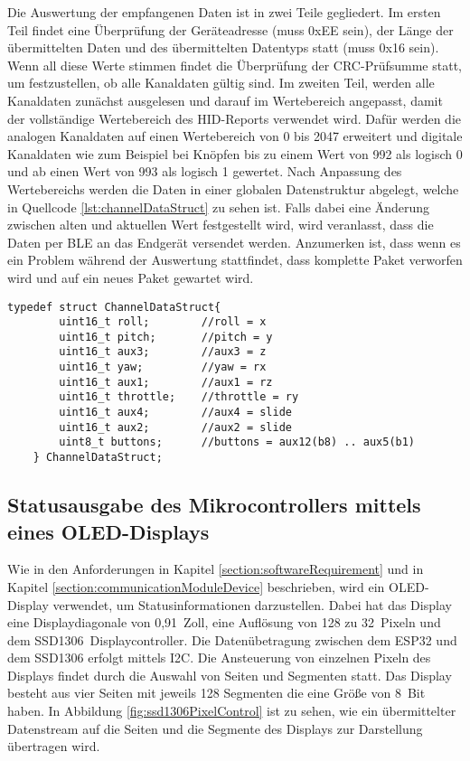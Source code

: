 Die Auswertung der empfangenen Daten ist in zwei Teile gegliedert. Im ersten Teil findet eine Überprüfung der Geräteadresse (muss 0xEE sein), der Länge der übermittelten Daten und des übermittelten Datentyps statt (muss 0x16 sein). Wenn all diese Werte stimmen findet die Überprüfung der \ac{CRC}-Prüfsumme statt, um festzustellen, ob alle Kanaldaten gültig sind. Im zweiten Teil, werden alle Kanaldaten zunächst ausgelesen und darauf im Wertebereich angepasst, damit der vollständige Wertebereich des \ac{HID}-Reports verwendet wird. Dafür werden die analogen Kanaldaten auf einen Wertebereich von 0 bis 2047 erweitert und digitale Kanaldaten wie zum Beispiel bei Knöpfen bis zu einem Wert von 992 als logisch 0 und ab einen Wert von 993 als logisch 1 gewertet. Nach Anpassung des Wertebereichs werden die Daten in einer globalen Datenstruktur abgelegt, welche in Quellcode \ref{lst:channelDataStruct} zu sehen ist. Falls dabei eine Änderung zwischen alten und aktuellen Wert festgestellt wird, wird veranlasst, dass die Daten per \ac{BLE} an das Endgerät versendet werden. Anzumerken ist, dass wenn es ein Problem während der Auswertung stattfindet, dass komplette Paket verworfen wird und auf ein neues Paket gewartet wird.

\begin{lstlisting}[caption=C-Strukuraufbau der aufbereiteten Kanaldaten, label={lst:channelDataStruct}, style=generalStyle]
    typedef struct ChannelDataStruct{
        uint16_t roll;        //roll = x
        uint16_t pitch;       //pitch = y
        uint16_t aux3;        //aux3 = z
        uint16_t yaw;         //yaw = rx
        uint16_t aux1;        //aux1 = rz
        uint16_t throttle;    //throttle = ry
        uint16_t aux4;        //aux4 = slide
        uint16_t aux2;        //aux2 = slide
        uint8_t buttons;      //buttons = aux12(b8) .. aux5(b1)
    } ChannelDataStruct;
\end{lstlisting}

\subsection{Statusausgabe des Mikrocontrollers mittels eines \acs{OLED}-Displays}
Wie in den Anforderungen in Kapitel \ref{section:softwareRequirement} und in Kapitel \ref{section:communicationModuleDevice} beschrieben, wird ein \acs{OLED}-Display verwendet, um Statusinformationen darzustellen. Dabei hat das Display eine Displaydiagonale von 0,91~Zoll, eine Auflösung von 128 zu 32~Pixeln und dem SSD1306~Displaycontroller. Die Datenübetragung zwischen dem ESP32 und dem SSD1306 erfolgt mittels \ac{I2C}. Die Ansteuerung von einzelnen Pixeln des Displays findet durch die Auswahl von Seiten und Segmenten statt. Das Display besteht aus vier Seiten mit jeweils 128 Segmenten die eine Größe von 8~Bit haben. In Abbildung \ref{fig:ssd1306PixelControl} ist zu sehen, wie ein übermittelter Datenstream auf die Seiten und die Segmente des Displays zur Darstellung übertragen wird.

